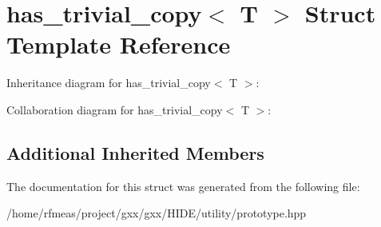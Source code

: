 \hypertarget{structhas__trivial__copy}{}\section{has\+\_\+trivial\+\_\+copy$<$ T $>$ Struct Template Reference}
\label{structhas__trivial__copy}


Inheritance diagram for has\+\_\+trivial\+\_\+copy$<$ T $>$\+:


Collaboration diagram for has\+\_\+trivial\+\_\+copy$<$ T $>$\+:
\subsection*{Additional Inherited Members}


The documentation for this struct was generated from the following file\+:\begin{DoxyCompactItemize}
\item 
/home/rfmeas/project/gxx/gxx/\+H\+I\+D\+E/utility/prototype.\+hpp\end{DoxyCompactItemize}

